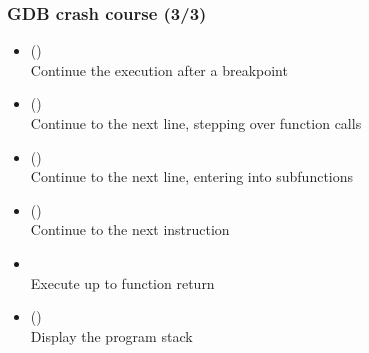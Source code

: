 \begin{frame}
  \frametitle{GDB crash course (3/3)}
  \small
  \begin{itemize}
  \item {} ()\\
    Continue the execution after a breakpoint
  \item {} ()\\
    Continue to the next line, stepping over function calls
  \item {} ()\\
    Continue to the next line, entering into subfunctions
  \item {} ()\\
    Continue to the next instruction
  \item {}\\
    Execute up to function return
  \item {} ()\\
    Display the program stack
  \end{itemize}
\end{frame}

